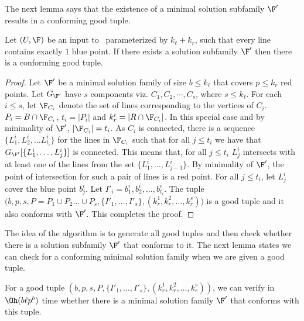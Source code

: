 The next lemma says that the existence of a minimal solution subfamily $\F'$ results in a conforming good tuple. 
\begin{lem}
\label{lem:conformingoodtuplexists}
Let  $(U,\F )$ be an input to  \slrbsc\ parameterized by $k_\ell+ k_r$, such that every line contains exactly $1$ blue point. If there exists a solution subfamily $\F'$ then there is a conforming good tuple. 
\end{lem}
\begin{proof}
Let $\F'$ be a minimal solution family of size $b \leq k_\ell$ that covers $p\leq k_r$ red points. Let $G_{\F'}$ have $s$ components viz. $C_1,C_2,\cdots,C_{s}$, where $s \leq k_\ell$. For each $i \leq s$, let $\F_{C_i}$ denote the set of lines corresponding to the vertices of $C_i$. $P_i = B \cap \F_{C_i}$, $t_i = \vert P_i \vert$ and $k_r^i = \vert R \cap \F_{C_i} \vert$. In this special case and by minimality of $\F'$, $\vert \F_{C_i} \vert = t_i$. As $C_i$ is connected, there is a sequence $\{L_1^i,L_2^i,\ldots L_{t_i}^i\}$ for the lines in $\F_{C_i}$ such that for all $j\leq t_i$ we have that 
    $G_{\F'}[\{L_1^i,\ldots,L_{j}^i \} ]$ is connected. This means that, for all $j\leq t_i$ $L_{j}^i$ intersects with at least one of the lines from the set $\{L_1^i,\ldots,L_{j-1}^i \}$. By minimality of $\F'$, the point of intersection for such a pair of lines is a red point. For all $j \leq t_i$, let $L_j^i$ cover the blue point $b_j^i$. Let $I'_i = b_1^i,b_2^i,\ldots,b_{t_i}^i$. 
The tuple $\Big(b,p,s, P=P_1\cup P_2 \ldots \cup P_s, \{I'_1,\ldots,I'_s\}, (k_r^1,k_r^2,\ldots, k_r^s)\Big)$ is a good tuple and it also conforms with $\F'$.   This completes the proof.  
\end{proof}



The idea of the algorithm is to generate all good tuples and then check whether there is a 
solution subfamily $\F'$ that conforms to it. The next lemma states we can check for a conforming minimal solution family when we are given a good tuple. 
\begin{lem}\label{good_tuples}
 For a good tuple $(b,p,s, P,   \{I'_1,\ldots,I'_s\}, (k_r^1,k_r^2,\ldots, k_r^s))$, 
we can verify in $\Oh(b \ell p^b)$ time whether there is a minimal solution family $\F'$ that conforms with this tuple.
\end{lem}

